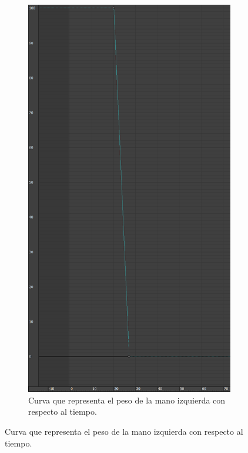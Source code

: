 \begin{figure}[H]
    \centering
    \begin{subfigure}[t]{0.27\textwidth}
        \centering
        \includegraphics[width=\textwidth]{imagenes/espada/peso0.png}
        \caption{Curva que representa el peso de la mano izquierda con respecto al tiempo.}
     \end{subfigure}

\end{figure}
